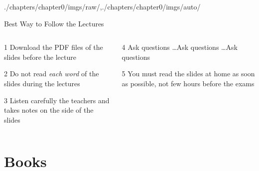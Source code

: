 \begin{graphicspathcontext}{{./chapters/chapter0/imgs/raw/},{./chapters/chapter0/imgs/auto/}}
\begin{frame}{Best Way to Follow the Lectures}
	\begin{columns}
		\begin{column}{.5\linewidth}
			\begin{rightanchorblock}{}{1}
				Download the PDF files of the slides before the lecture
			\end{rightanchorblock}
			\begin{rightanchorblock}{}{2}
				Do not read \emph{each word} of the slides during the lectures
			\end{rightanchorblock}
			\begin{rightanchorblock}{}{3}
				Listen carefully the teachers and takes notes on the side of the slides
			\end{rightanchorblock}
		\end{column}
		\begin{column}{.5\linewidth}
			\begin{leftanchorblock}{}{4}
				Ask questions \dots Ask questions \dots Ask questions
			\end{leftanchorblock}
			\vspace{.5cm}
			\begin{leftanchorblock}{}{5}
				You must read the slides at home as soon as possible, not few hours before the exams
			\end{leftanchorblock}
		\end{column}
	\end{columns}
\end{frame}

\section{Books}



\end{graphicspathcontext}

